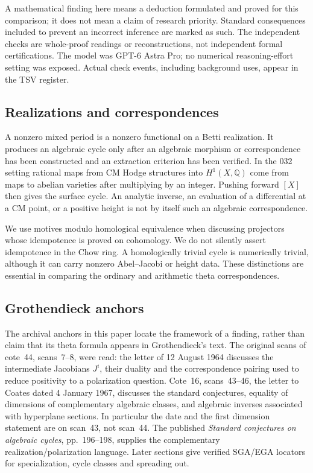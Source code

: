 \documentclass[11pt]{article}
\newcommand{\Q}{\mathbb Q}\newcommand{\C}{\mathbb C}\newcommand{\Z}{\mathbb Z}\newcommand{\R}{\mathbb R}\newcommand{\A}{\mathbb A}\newcommand{\OO}{\mathcal O}
\theoremstyle{definition}\newtheorem{definition}[theorem]{Definition}\newtheorem{remark}[theorem]{Remark}
\begin{document}
A mathematical finding here means a deduction formulated and proved for this comparison; it does not mean a claim of research priority. Standard consequences included to prevent an incorrect inference are marked as such. The independent checks are whole-proof readings or reconstructions, not independent formal certifications. The model was GPT-6 Astra Pro; no numerical reasoning-effort setting was exposed. Actual check events, including background uses, appear in the TSV register.

\subsection{Realizations and correspondences}
A nonzero mixed period is a nonzero functional on a Betti realization. It produces an algebraic cycle only after an algebraic morphism or correspondence has been constructed and an extraction criterion has been verified. In the 032 setting rational maps from CM Hodge structures into $H^1(X,\Q)$ come from maps to abelian varieties after multiplying by an integer. Pushing forward $[X]$ then gives the surface cycle. An analytic inverse, an evaluation of a differential at a CM point, or a positive height is not by itself such an algebraic correspondence.

We use motives modulo homological equivalence when discussing projectors whose idempotence is proved on cohomology. We do not silently assert idempotence in the Chow ring. A homologically trivial cycle is numerically trivial, although it can carry nonzero Abel--Jacobi or height data. These distinctions are essential in comparing the ordinary and arithmetic theta correspondences.

\subsection{Grothendieck anchors}
The archival anchors in this paper locate the framework of a finding, rather than claim that its theta formula appears in Grothendieck's text. The original scans of cote~44, scans~7--8, were read: the letter of 12 August 1964 discusses the intermediate Jacobians $J^i$, their duality and the correspondence pairing used to reduce positivity to a polarization question. Cote~16, scans~43--46, the letter to Coates dated 4 January 1967, discusses the standard conjectures, equality of dimensions of complementary algebraic classes, and algebraic inverses associated with hyperplane sections. In particular the date and the first dimension statement are on scan~43, not scan~44. The published \emph{Standard conjectures on algebraic cycles}, pp.~196--198, supplies the complementary realization/polarization language. Later sections give verified SGA/EGA locators for specialization, cycle classes and spreading out.
\end{document}
